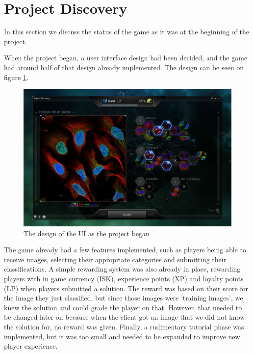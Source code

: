 \section{Project Discovery}\label{sec:project_discovery}
In this section we discuss the status of the game as it was at the beginning of the project.

When the project began, a user interface design had been decided, and the game had around half of that design already implemented. The design can be seen on figure \ref{fig:PD}.

\begin{figure}[H]
	\centering
	\graphicspath{ {./graphics/} }
    \centerline{\includegraphics[scale=0.35]{PD.png}}
    \caption{\label{fig:PD}The design of the UI as the project began}
\end{figure}
\clearpage

The game already had a few features implemented, such as players being able to receive images, selecting their appropriate categories and submitting their classifications. A simple rewarding system was also already in place, rewarding players with in game currency (ISK), experience points (XP) and loyalty points (LP) when players submitted a solution. The reward was based on their score for the image they just classified, but since those images were 'training images', we knew the solution and could grade the player on that. However, that needed to be changed later on because when the client got an image that we did not know the solution for, no reward was given. Finally, a rudimentary tutorial phase was implemented, but it was too small and needed to be expanded to improve new player experience.


